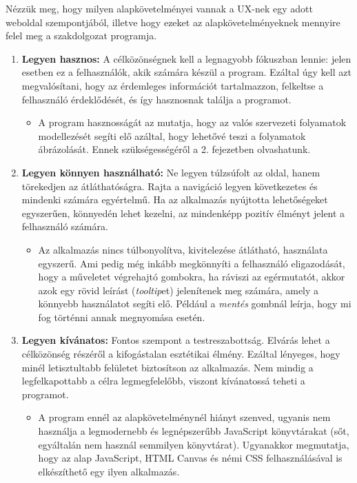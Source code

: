 
Nézzük meg, hogy milyen alapkövetelményei vannak a UX-nek egy adott weboldal szempontjából, illetve hogy ezeket az alapkövetelményeknek mennyire felel meg a szakdolgozat programja.

\begin{enumerate}
\item \textbf{Legyen hasznos:} A célközönségnek kell a legnagyobb fókuszban lennie: jelen esetben ez a felhasználók, akik számára készül a program. Ezáltal úgy kell azt megvalósítani, hogy az érdemleges információt tartalmazzon, felkeltse a felhasználó érdeklődését, és így hasznosnak találja a programot.

\begin{itemize}
\item A program hasznosságát az mutatja, hogy az valós szervezeti folyamatok modellezését segíti elő azáltal, hogy lehetővé teszi a folyamatok ábrázolását. Ennek szükségességéről a 2. fejezetben olvashatunk.
\end{itemize}

\item \textbf{Legyen könnyen használható:} Ne legyen túlzsúfolt az oldal, hanem törekedjen az átláthatóságra. Rajta a navigáció legyen következetes és mindenki számára egyértelmű. Ha az alkalmazás nyújtotta lehetőségeket egyszerűen, könnyedén lehet kezelni, az mindenképp pozitív élményt jelent a felhasználó számára.

\begin{itemize}
\item Az alkalmazás nincs túlbonyolítva, kivitelezése átlátható, használata egyszerű. Ami pedig még inkább megkönnyíti a felhasználó eligazodását, hogy a műveletet végrehajtó gombokra, ha ráviszi az egérmutatót, akkor azok egy rövid leírást (\textit{tooltip}et) jelenítenek meg számára, amely a könnyebb használatot segíti elő. Például a \textit{mentés} gombnál leírja, hogy mi fog történni annak megnyomása esetén.
\end{itemize}
\item \textbf{Legyen kívánatos:} Fontos szempont a testreszabottság. Elvárás lehet a célközönség részéről a kifogástalan esztétikai élmény. Ezáltal lényeges, hogy minél letisztultabb felületet biztosítson az alkalmazás. Nem mindig a legfelkapottabb a célra legmegfelelőbb, viszont kívánatossá teheti a programot.

\begin{itemize}
\item A program ennél az alapkövetelménynél hiányt szenved, ugyanis nem használja a legmodernebb és legnépszerűbb JavaScript könyvtárakat (sőt, egyáltalán nem használ semmilyen könyvtárat). Ugyanakkor megmutatja, hogy az alap JavaScript, HTML Canvas és némi CSS felhasználásával is elkészíthető egy ilyen alkalmazás.
\end{itemize}


\end{enumerate}
